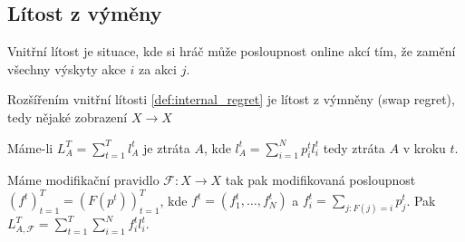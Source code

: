 \subsection{Lítost z výměny}
\begin{definition}\label{def:internal_regret}
Vnitřní lítost je situace, kde si hráč může posloupnost online akcí tím, že zamění všechny výskyty akce $i$ za akci $j$. 
\end{definition}
\begin{definition}\label{def:swap_regret}
    Rozšířením vnitřní lítosti \ref{def:internal_regret} je lítost z výmněny (swap regret), tedy nějaké zobrazení $X \rightarrow X$ 

    Máme-li $L^T_A = \sum^T_{t=1} l_A^t$ je ztráta $A$, kde $l^t_A = \sum^N_{i=1} p_i^t l_i^t$ tedy ztráta $A$ v kroku $t$. 

    Máme modifikační pravidlo $\mathcal{F}: X \rightarrow X$ tak pak modifikovaná posloupnost $(f^t)^T_{t=1} = (F(p^t))^T_{t=1}$, kde $f^t = (f_1^t, \dots, f_N^t)$ a $f^t_i = \sum_{j: F(j) = i} p_j^t$. 
    Pak $L^T_{A,\mathcal{F}} = \sum_{t=1}^T \sum_{i=1}^N f_i^t l_i^t$. 
\end{definition}

